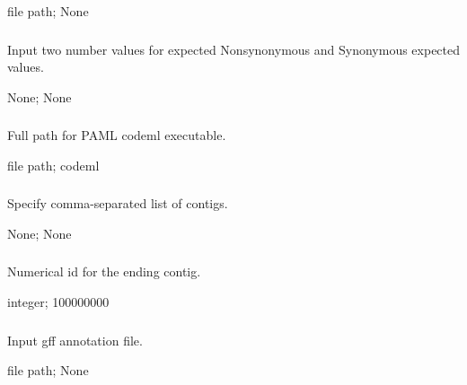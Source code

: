 \documentclass[letterpaper,11pt,english]{sphinxmanual}
\begin{document}
 file path;  None


\subsubsection{}
\label{\detokenize{prog_desc:chi-test-chitest}}
 Input two number values for expected Nonsynonymous and Synonymous expected values.

 None;  None


\subsubsection{}
\label{\detokenize{prog_desc:codeml-path-codemlpath}}
 Full path for PAML codeml executable.

 file path;  codeml


\subsubsection{}
\label{\detokenize{prog_desc:id103}}
 Specify comma-separated list of contigs.

 None;  None


\subsubsection{}
\label{\detokenize{prog_desc:end-contig-endcontig}}
 Numerical id for the ending contig.

 integer;  100000000


\subsubsection{}
\label{\detokenize{prog_desc:id104}}
 Input gff annotation file.

 file path;  None
\end{document}
